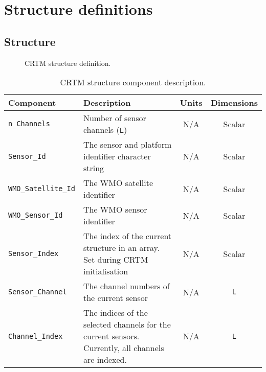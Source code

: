 \chapter{Structure definitions}

\clearpage
\section{\ChannelInfo{} Structure}
\label{sec:channelinfo_structure}

\begin{figure}[htp]
  \centering
  \caption{CRTM \ChannelInfo{} structure definition.}
  \label{fig:channelinfo_structure}
\end{figure}

\begin{table}[htp]
  \centering
  \begin{tabular}{l p{8cm} c c}
    \hline
    \sffamily\textbf{Component} & \sffamily\textbf{Description} & \sffamily\textbf{Units} & \sffamily\textbf{Dimensions} \\
    \hline\hline
    \texttt{n\_Channels}  & Number of sensor channels (\texttt{L}) & N/A & Scalar \\
    \texttt{Sensor\_Id} & The sensor and platform identifier character string & N/A & Scalar \\
    \texttt{WMO\_Satellite\_Id} & The WMO satellite identifier & N/A & Scalar \\
    \texttt{WMO\_Sensor\_Id} & The WMO sensor identifier & N/A & Scalar \\
    \texttt{Sensor\_Index} & The index of the current structure in an array. Set during CRTM initialisation & N/A & Scalar \\
    \texttt{Sensor\_Channel} & The channel numbers of the current sensor & N/A & \texttt{L}\\
    \texttt{Channel\_Index} & The indices of the selected channels for the current sensors. Currently, all channels are indexed. & N/A & \texttt{L}\\
    \hline
  \end{tabular}
  \caption{CRTM \ChannelInfo{} structure component description.}
  \label{tab:chanelinfo_structure}
\end{table}

